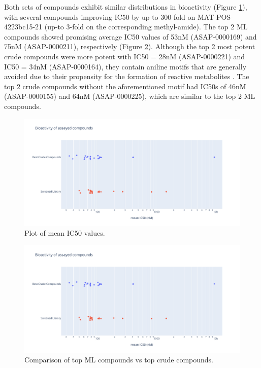 Both sets of compounds exhibit similar distributions in bioactivity (Figure \ref{fig:strip}), with several compounds improving IC50 by up-to 300-fold on MAT-POS-4223bc15-21 (up-to 3-fold on the corresponding methyl-amide). The top 2 ML compounds showed promising average IC50 values of 53nM (ASAP-0000169) and 75nM (ASAP-0000211), respectively (Figure \ref{fig:ml_vs_crude}). Although the top 2 most potent crude compounds were  more potent with IC50 = 28nM (ASAP-0000221) and IC50 = 34nM (ASAP-0000164), they contain aniline motifs that are generally avoided due to their propensity for the formation of reactive metabolites \cite{Stepan2011aniline}. The top 2 crude compounds without the aforementioned motif had IC50s of 46nM (ASAP-0000155) and 64nM (ASAP-0000225), which are similar to the top 2 ML compounds.

\begin{figure}
    \centering
    \includegraphics[width=\textwidth]{Chapters/Crude/Figs/strip_plot.pdf}
    \caption{Plot of mean IC50 values.}
    \label{fig:strip}
\end{figure}

\begin{figure}
    \centering
    \includegraphics[width=\textwidth]{Chapters/Crude/Figs/strip_plot.pdf}
    \caption{Comparison of top ML compounds vs top crude compounds.}
    \label{fig:ml_vs_crude}
\end{figure}

